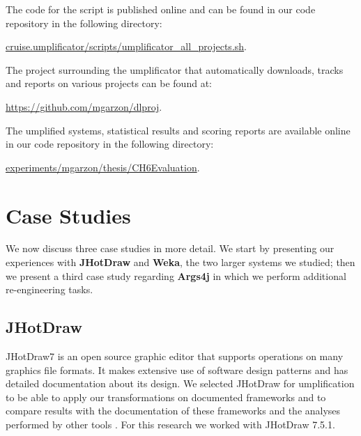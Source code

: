 The code for the script is published online and can be found in our code repository \cite{umpleRepository} in the following directory:

\url{cruise.umplificator/scripts/umplificator_all_projects.sh}.

The project surrounding the umplificator that automatically downloads, tracks and reports on various projects can be found at: 

\url{https://github.com/mgarzon/dlproj}.


The umplified systems, statistical results and scoring reports are available online in our code repository \cite{umpleRepository} in the following directory:

\url{experiments/mgarzon/thesis/CH6Evaluation}.



\section{Case Studies}
\label{sec:6CaseStudies}

We now discuss three case studies in more detail. We start by presenting our experiences with \textbf{JHotDraw} and \textbf{Weka}, the two larger systems we studied; then we present a third case study regarding \textbf{Args4j} in which we perform additional re-engineering tasks.

\subsection{JHotDraw}
 
JHotDraw7 \cite{jhotdraw} is an open source graphic editor that supports operations on many graphics file formats. It makes extensive use of software design patterns and has detailed documentation about its design. We selected JHotDraw for umplification to be able to apply our transformations on documented frameworks and to compare results with the documentation of these frameworks and the analyses performed by other tools \cite{jhotdraw}. For this research we worked with JHotDraw 7.5.1.

